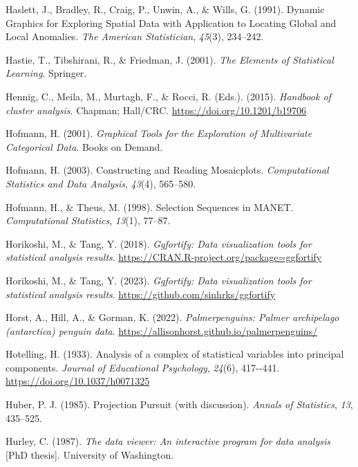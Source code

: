 \documentclass[
  letterpaper,
]{krantz}
\newlength{\cslhangindent}
\newenvironment{CSLReferences}[2] %
 {\begin{list}{}{%
  \setlength{\itemindent}{0pt}
  \setlength{\leftmargin}{0pt}
  \setlength{\parsep}{0pt}
  \ifodd #1
   \setlength{\leftmargin}{\cslhangindent}
   \setlength{\itemindent}{-1\cslhangindent}
  \fi
  \setlength{\itemsep}{#2\baselineskip}}}
 {\end{list}}
\begin{document}
\begin{CSLReferences}{1}{0}
Haslett, J., Bradley, R., Craig, P., Unwin, A., \& Wills, G. (1991).
{D}ynamic {G}raphics for {E}xploring {S}patial {D}ata with {A}pplication
to {L}ocating {G}lobal and {L}ocal {A}nomalies. \emph{The American
Statistician}, \emph{45}(3), 234--242.

Hastie, T., Tibshirani, R., \& Friedman, J. (2001). \emph{The {E}lements
of {S}tatistical {L}earning}. Springer.

Hennig, C., Meila, M., Murtagh, F., \& Rocci, R. (Eds.). (2015).
\emph{Handbook of cluster analysis}. Chapman; Hall/{CRC}.
\url{https://doi.org/10.1201/b19706}

Hofmann, H. (2001). \emph{Graphical {T}ools for the {E}xploration of
{M}ultivariate {C}ategorical {D}ata}. Books on Demand.

Hofmann, H. (2003). Constructing and {R}eading {M}osaicplots.
\emph{Computational Statistics and Data Analysis}, \emph{43}(4),
565--580.

Hofmann, H., \& Theus, M. (1998). Selection {S}equences in {MANET}.
\emph{Computational Statistics}, \emph{13}(1), 77--87.

Horikoshi, M., \& Tang, Y. (2018). \emph{Ggfortify: Data visualization
tools for statistical analysis results}.
\url{https://CRAN.R-project.org/package=ggfortify}

Horikoshi, M., \& Tang, Y. (2023). \emph{Ggfortify: Data visualization
tools for statistical analysis results}.
\url{https://github.com/sinhrks/ggfortify}

Horst, A., Hill, A., \& Gorman, K. (2022). \emph{Palmerpenguins: Palmer
archipelago (antarctica) penguin data}.
\url{https://allisonhorst.github.io/palmerpenguins/}

Hotelling, H. (1933). Analysis of a complex of statistical variables
into principal components. \emph{Journal of Educational Psychology},
\emph{24}(6), 417-\/-441. \url{https://doi.org/10.1037/h0071325}

Huber, P. J. (1985). {P}rojection {P}ursuit (with discussion).
\emph{Annals of Statistics}, \emph{13}, 435--525.

Hurley, C. (1987). \emph{The data viewer: An interactive program for
data analysis} {[}PhD thesis{]}. University of Washington.


\end{CSLReferences}
\end{document}
